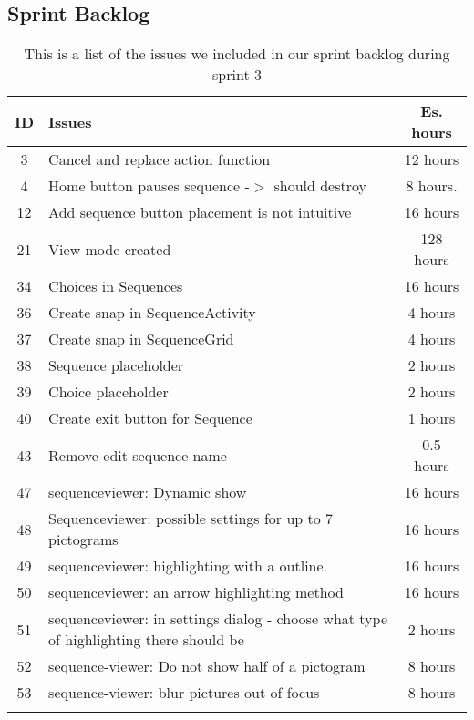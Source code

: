 \subsection{Sprint Backlog}\label{subsec:spr3_sprblog}
\begin{longtable} { | c | p{12cm} | c | } 
\hline
	ID 	&	Issues	&	Es. hours  \\\hline
	3	& 	Cancel and replace action function	&	12 hours \\\hline
	4	&	Home button pauses sequence -$>$ should destroy	&	8 hours.	\\\hline
	12	& 	Add sequence button placement is not intuitive	&	16 hours 	\\\hline
	21	& 	View-mode created				&	128 hours	\\\hline
	34	&	Choices in Sequences				& 	16 hours  \\\hline
	36	& 	Create snap in SequenceActivity		&	4 hours  \\\hline
	37	&	Create snap in SequenceGrid		& 	4 hours \\\hline
	38	& 	Sequence placeholder 			&	2 hours\\\hline
	39	&	Choice placeholder		 		&	2 hours \\\hline
	40	&	Create exit button for Sequence	&	1 hours \\\hline
	43	&	Remove edit sequence name 					&	0.5 hours \\\hline
	47	&	sequenceviewer: Dynamic show	 	&	16 hours \\\hline
	48	&	Sequenceviewer: possible settings for up to 7 pictograms	 & 	16 hours	\\\hline
	49	&	sequenceviewer: highlighting with a outline.	  &	16 hours \\\hline
	50	&	sequenceviewer: an arrow highlighting method	 &	16 hours \\\hline
	51	&	sequenceviewer: in settings dialog - choose what type of highlighting there should be	 &	2 hours \\\hline
	52	&	sequence-viewer: Do not show half of a pictogram	&	8 hours	\\\hline
	53	&	sequence-viewer: blur pictures out of focus		 &	8 hours \\\hline
\caption{This is a list of the issues we included in our sprint backlog during sprint 3}
\label{tab:spr3_sprintblog}
\end{longtable}